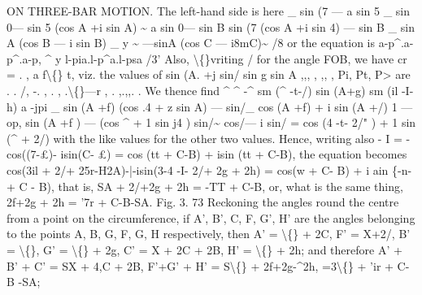 \documentclass[11pt,a4paper]{book}
\begin{document}
ON THREE-BAR MOTION.
The left-hand side
is here
\_ sin (7 --- a sin 5 \_ sin 0--- sin 5 (cos A +i sin A)
\textasciitilde{} a sin 0--- sin B
sin (7 (cos A +i sin 4) --- sin B
\_
sin A (cos B --- i sin B) \_
y
\textasciitilde{} ---sinA (cos C --- i8mC)\textasciitilde{}
/8
or the equation
is
a-p\textasciicircum{}.a-p\textasciicircum{}.a-p,
\textasciicircum{}
y
l-pia.l-p\textasciicircum{}a.l-psa
/3'
Also,
\textbackslash\{\}vriting /
for
the
angle FOB,
we
have
cr =
.
,
a
f\textbackslash\{\} t,
viz.
the
values
of
sin (A. +j
sin/
sin g
sin A
,,,
,
,,
,
Pi,
Pt, P> are
.
. /,
-.
,
.
, .\textbackslash\{\}---r
,
.
,.,,.
. We thence
find
\textasciicircum{}
\textasciicircum{}
-\textasciicircum{}
sm (\textasciicircum{} -t-/)
sin (A+g)
sm (il
-I- h)
a -jpi \_ sin (A +f) (cos .4 + z sin A) --- sin/\_ cos (A +f) + i sin (A +/)
1 --- op,
sin (A +f ) --- (cos \textasciicircum{} + 1 sin j4 ) sin/\textasciitilde{}
cos/--- i sin/
= cos (4
-t- 2/" ) + 1 sin (\textasciicircum{} + 2/)
with
the
like
values
for
the
other
two
values.
Hence, writing
also
- I = - cos((7-\pounds{})- isin(C- \pounds{}) = cos (tt + C-B) + isin (tt + C-B),
the equation becomes
cos(3il + 2/+ 25r-H2A)-|-isin(3-4
-I- 2/+ 2g + 2h) = cos(w + C- B) + i ain \{-n- + C - B),
that
is,
SA + 2/+2g + 2h =
-TT + C-B,
or, what
is the same thing,
2f+2g + 2h = '7r + C-B-SA.
Fig.
3.
73
Reckoning
the
angles
round
the
centre
from
a
point
on
the
circumference,
if
A',
B',
C, F,
G',
H'
are
the
angles
belonging
to
the
points
A,
B,
G,
F,
G, H
respectively, then
A' = \textbackslash\{\} + 2C,
F' = X+2/,
B' = \textbackslash\{\},
G' = \textbackslash\{\} + 2g,
C' = X + 2C + 2B,
H' = \textbackslash\{\} + 2h;
and
therefore
A' + B' + C' = SX + 4,C + 2B,
F'+G' + H' = S\textbackslash\{\} + 2f+2g-\textasciicircum{}2h,
=3\textbackslash\{\} + 'ir + C-B -SA;
\end{document}
